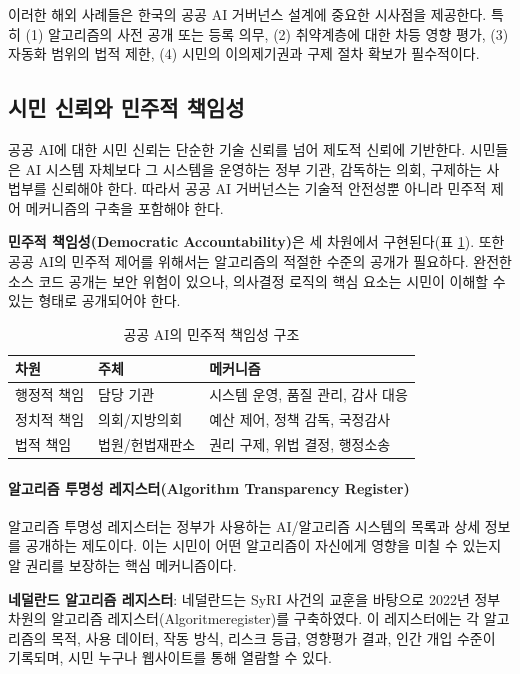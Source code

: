 이러한 해외 사례들은 한국의 공공 AI 거버넌스 설계에 중요한 시사점을 제공한다. 특히 (1) 알고리즘의 사전 공개 또는 등록 의무, (2) 취약계층에 대한 차등 영향 평가, (3) 자동화 범위의 법적 제한, (4) 시민의 이의제기권과 구제 절차 확보가 필수적이다.

\subsection{시민 신뢰와 민주적 책임성}
\label{sec:18.1.2}

공공 AI에 대한 시민 신뢰는 단순한 기술 신뢰를 넘어 제도적 신뢰에 기반한다. 시민들은 AI 시스템 자체보다 그 시스템을 운영하는 정부 기관, 감독하는 의회, 구제하는 사법부를 신뢰해야 한다. 따라서 공공 AI 거버넌스는 기술적 안전성뿐 아니라 민주적 제어 메커니즘의 구축을 포함해야 한다.

\textbf{민주적 책임성(Democratic Accountability)}은 세 차원에서 구현된다(표 \ref{tab:18_2}). 또한 공공 AI의 민주적 제어를 위해서는 알고리즘의 적절한 수준의 공개가 필요하다. 완전한 소스 코드 공개는 보안 위험이 있으나, 의사결정 로직의 핵심 요소는 시민이 이해할 수 있는 형태로 공개되어야 한다.

\begin{table}[htbp]
\centering
\caption{공공 AI의 민주적 책임성 구조}
\label{tab:18_2}
\begin{tabularx}{\textwidth}{p{2cm}p{3cm}X}
\toprule
\textbf{차원} & \textbf{주체} & \textbf{메커니즘} \\
\midrule
행정적 책임 & 담당 기관 & 시스템 운영, 품질 관리, 감사 대응 \\
정치적 책임 & 의회/지방의회 & 예산 제어, 정책 감독, 국정감사 \\
법적 책임 & 법원/헌법재판소 & 권리 구제, 위법 결정, 행정소송 \\
\bottomrule
\end{tabularx}
\end{table}

\paragraph{알고리즘 투명성 레지스터(Algorithm Transparency Register)}

알고리즘 투명성 레지스터는 정부가 사용하는 AI/알고리즘 시스템의 목록과 상세 정보를 공개하는 제도이다. 이는 시민이 어떤 알고리즘이 자신에게 영향을 미칠 수 있는지 알 권리를 보장하는 핵심 메커니즘이다.

\textbf{네덜란드 알고리즘 레지스터}: 네덜란드는 SyRI 사건의 교훈을 바탕으로 2022년 정부 차원의 알고리즘 레지스터(Algoritmeregister)를 구축하였다. 이 레지스터에는 각 알고리즘의 목적, 사용 데이터, 작동 방식, 리스크 등급, 영향평가 결과, 인간 개입 수준이 기록되며, 시민 누구나 웹사이트를 통해 열람할 수 있다.

